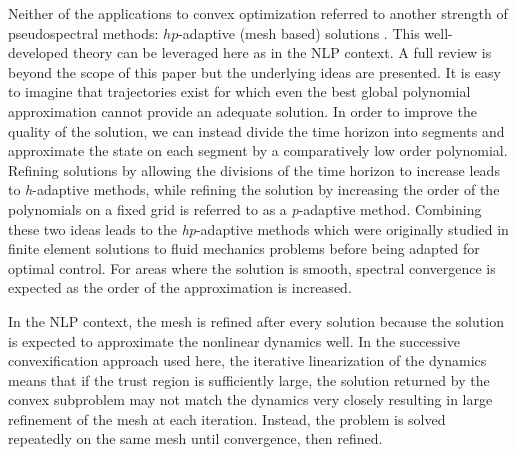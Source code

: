 \documentclass[10pt,a4paper]{article}
\begin{document}
	Neither of the applications \cite{PS_Convex,PS_Convex_ascent} to convex optimization referred to another strength of pseudospectral methods: $ hp $-adaptive (mesh based) solutions \cite{GPOPS,hp_adapt}. This well-developed theory can be leveraged here as in the NLP context. A full review is beyond the scope of this paper but the underlying ideas are presented. It is easy to imagine that trajectories exist for which even the best global polynomial approximation cannot provide an adequate solution. In order to improve the quality of the solution, we can instead divide the time horizon into segments and approximate the state on each segment by a comparatively low order polynomial. Refining solutions by allowing the divisions of the time horizon to increase leads to \textit{h}-adaptive methods, while refining the solution by increasing the order of the polynomials on a fixed grid is referred to as a \textit{p}-adaptive method. Combining these two ideas leads to the \textit{hp}-adaptive methods which were originally studied in finite element solutions to fluid mechanics problems \cite{HPAdapt_origin} before being adapted for optimal control. For areas where the solution is smooth, spectral convergence is expected as the order of the approximation is increased.
	
	In the NLP context, the mesh is refined after every solution because the solution is expected to approximate the nonlinear dynamics well. In the successive convexification approach used here, the iterative linearization of the dynamics means that if the trust region is sufficiently large, the solution returned by the convex subproblem may not match the dynamics very closely resulting in large refinement of the mesh at each iteration. Instead, the problem is solved repeatedly on the same mesh until convergence, then refined.
	
	
\end{document}
